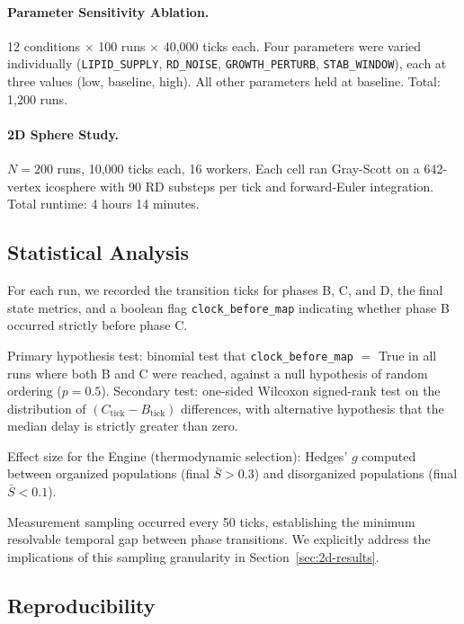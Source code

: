 \documentclass[11pt,letterpaper]{article}
\begin{document}
\paragraph{Parameter Sensitivity Ablation.} 12 conditions $\times$ 100 runs $\times$ 40{,}000 ticks each. Four parameters were varied individually (\texttt{LIPID\_SUPPLY}, \texttt{RD\_NOISE}, \texttt{GROWTH\_PERTURB}, \texttt{STAB\_WINDOW}), each at three values (low, baseline, high). All other parameters held at baseline. Total: 1{,}200 runs.

\paragraph{2D Sphere Study.} $N = 200$ runs, 10{,}000 ticks each, 16 workers. Each cell ran Gray-Scott on a 642-vertex icosphere with 90 RD substeps per tick and forward-Euler integration. Total runtime: 4 hours 14 minutes.

\subsection{Statistical Analysis}

For each run, we recorded the transition ticks for phases B, C, and D, the final state metrics, and a boolean flag \texttt{clock\_before\_map} indicating whether phase B occurred strictly before phase C.

Primary hypothesis test: binomial test that \texttt{clock\_before\_map} $=$ True in all runs where both B and C were reached, against a null hypothesis of random ordering ($p = 0.5$). Secondary test: one-sided Wilcoxon signed-rank test on the distribution of $(C_\mathrm{tick} - B_\mathrm{tick})$ differences, with alternative hypothesis that the median delay is strictly greater than zero.

Effect size for the Engine (thermodynamic selection): Hedges' $g$ computed between organized populations (final $\bar{S} > 0.3$) and disorganized populations (final $\bar{S} < 0.1$).

Measurement sampling occurred every 50 ticks, establishing the minimum resolvable temporal gap between phase transitions. We explicitly address the implications of this sampling granularity in Section~\ref{sec:2d-results}.

\subsection{Reproducibility}
\label{sec:repro}
\end{document}
